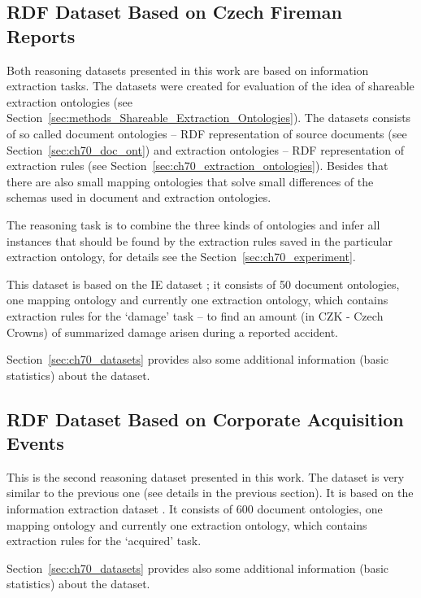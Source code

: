 \subsection{RDF Dataset Based on Czech Fireman Reports} \label{sec:ch40_rdf_fireman}

Both reasoning datasets presented in this work are based on information extraction tasks. The datasets were created for evaluation of the idea of shareable extraction ontologies (see Section~\ref{sec:methods_Shareable_Extraction_Ontologies}). The datasets consists of so called document ontologies -- RDF representation of source documents (see Section~\ref{sec:ch70_doc_ont}) and extraction ontologies -- RDF representation of extraction rules (see Section~\ref{sec:ch70_extraction_ontologies}). Besides that there are also small mapping ontologies that solve small differences of the schemas used in document and extraction ontologies.

The reasoning task is to combine the three kinds of ontologies and infer all instances that should be found by the extraction rules saved in the particular extraction ontology, for details see the Section~\ref{sec:ch70_experiment}.

This dataset is based on the IE dataset ; it consists of 50 document ontologies, one mapping ontology and currently one extraction ontology, which contains extraction rules for the `damage' task -- to find an amount (in CZK - Czech Crowns) of summarized damage arisen during a reported accident.

Section~\ref{sec:ch70_datasets} provides also some additional information (basic statistics) about the dataset.


\subsection{RDF Dataset Based on Corporate Acquisition Events} \label{sec:ch40_rdf_acquisitions}

This is the second reasoning dataset presented in this work. The dataset is very similar to the previous one (see details in the previous section). It is based on the information extraction dataset . It consists of 600 document ontologies, one mapping ontology and currently one extraction ontology, which contains extraction rules for the `acquired' task.

Section~\ref{sec:ch70_datasets} provides also some additional information (basic statistics) about the dataset.



